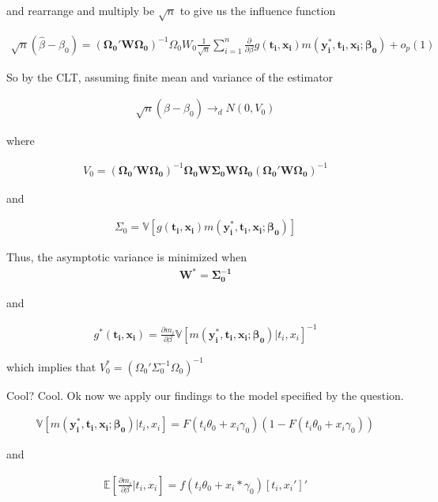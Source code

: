 \documentclass[12pt]{article}
\newcommand{\E}{\mathbb{E}}
\newcommand{\V}{\mathbb{V}}
\newcommand{\qsum}{\sum\limits_{i=1}^n}
\begin{document}
and rearrange and multiply be $\sqrt{n}$ to give us the influence function

\begin{align*}
\sqrt{n} (\hat\beta - \beta_0) = \left(  \mathbf{\Omega_0'W\Omega_0} \right)^{-1} \Omega_0 W_0 \frac{1}{\sqrt{n}} \qsum \frac{\partial}{\partial\beta} g\mathbf{(t_i,x_i)}m\mathbf{(y_i^*,t_i,x_i;\beta_0)} + o_p(1)
\end{align*}

So by the CLT, assuming finite mean and variance of the estimator

\begin{align*}
\sqrt{n} (\hat\beta - \beta_0) \rightarrow_d N(0,V_0)
\end{align*}

where

\begin{align*}
  V_0 = \left(  \mathbf{\Omega_0'W\Omega_0} \right)^{-1} \mathbf{\Omega_0 W \Sigma_0 W \Omega_0} \left(  \mathbf{\Omega_0'W\Omega_0} \right)^{-1}
\end{align*}

and

\begin{align*}
  \Sigma_0 = \V[g\mathbf{(t_i,x_i)}m\mathbf{(y_i^*,t_i,x_i;\beta_0)}]
\end{align*}

Thus, the asymptotic variance is minimized when
\begin{align}
  \mathbf{W^* = \Sigma_0^{-1}}
\end{align}

and

\begin{align*}
g^*\mathbf{(t_i,x_i)} = \frac{\partial m_i}{\partial \beta} \V [ m\mathbf{(y_i^*,t_i,x_i;\beta_0)} |t_i,x_i]^{-1}
\end{align*}

which implies that $V_0^* = \left(  \Omega_0'\Sigma_0^{-1}  \Omega_0 \right)^{-1}$

Cool? Cool. Ok now we apply our findings to the model specified by the question.


\begin{align*}
\V [ m\mathbf{(y_i^*,t_i,x_i;\beta_0)} |t_i,x_i] =  F(t_i \theta_0 + x_i\gamma_0)(1 - F(t_i \theta_0 + x_i\gamma_0))
\end{align*}

and


\begin{align*}
\E [\frac{\partial m_i}{\partial \beta} |t_i,x_i] =  f(t_i\theta_0 + x_i*\gamma_0) [t_i,x_i']'
\end{align*}
\end{document}

